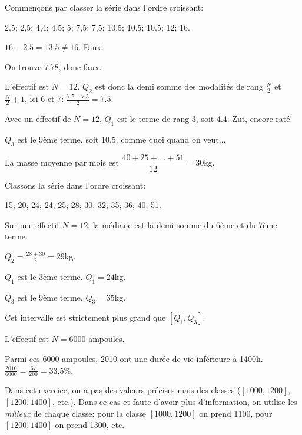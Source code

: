 \documentclass[a4paper,12pt]{scrartcl}
\begin{document}
Commençons par classer la série dans l'ordre croissant:

2,5; 2,5; 4,4; 4,5; 5; 7,5; 7,5; 10,5; 10,5; 10,5; 12; 16.


$16-2.5 = 13.5 \neq 16$. Faux.



On trouve 7.78, donc faux.



L'effectif est $N=12$. $Q_2$ est donc la demi somme des modalités de rang $\frac{N}{2}$ et $\frac{N}{2}+1$, ici 6 et 7: $\frac{7.5+7.5}{2}=7.5$. 



Avec un effectif de $N = 12$, $Q_1$ est le terme de rang 3, soit 4.4. Zut, encore raté!



$Q_3$ est le 9ème terme, soit 10.5. comme quoi quand on veut...




La masse moyenne par mois est $\dfrac{40+25+\ldots +51}{12} = 30$kg.



Classons la série dans l'ordre croissant:

15; 20; 24; 24; 25; 28; 30; 32; 35; 36; 40; 51.

Sur une effectif $N=12$, la médiane est la demi somme du 6ème et du 7ème terme.

$Q_2 = \frac{28+30}{2} = 29$kg.



$Q_1$ est le 3ème terme. $Q_1 = 24$kg.

$Q_3$ est le 9ème terme. $Q_3 = 35$kg.


\question{}

Cet intervalle est strictement plus grand que $\left[ Q_1, Q_3 \right]$.




L'effectif est $N = 6000$ ampoules.

Parmi ces 6000 ampoules, 2010 ont une durée de vie inférieure à 1400h. $\frac{2010}{6000} = \frac{67}{200} = 33.5\%$.


Dans cet exercice, on a pas des valeurs précises mais des classes ($[1000,1200]$, $[1200,1400]$, etc.). Dans ce cas et faute d'avoir plus d'information, on utilise les \emph{milieux} de chaque classe: pour la classe $[1000,1200]$ on prend 1100, pour $[1200,1400]$ on prend 1300, etc.
\end{document}
